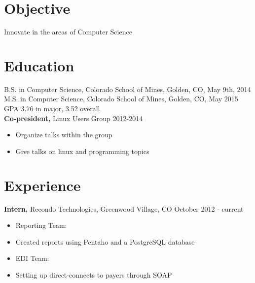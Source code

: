 \documentclass[12pt]{res}
\begin{document}

\address{{\bf Present Address} \\ 266 Pinto St \\ Golden, CO 80401 }
\address{{\bf Contact Information} \\ (720) 219-7914 \\ gik0geck0@gmail.com \\ https://github.com/gik0geck0 }

\begin{resume}

\section{Objective}
Innovate in the areas of Computer Science

\section{Education}
B.S. in Computer Science, Colorado School of Mines, Golden, CO, May 9th, 2014 \\
M.S. in Computer Science, Colorado School of Mines, Golden, CO, May 2015 \\
GPA 3.76 in major, 3.52 overall \\
{\bf Co-president,} Linux Users Group \hfill 2012-2014
    \begin{itemize} \itemsep -2pt
        \item Organize talks within the group
        \item Give talks on linux and programming topics
    \end{itemize}


\section{Experience}
 {\bf Intern,} Recondo Technologies, Greenwood Village, CO \hfill October 2012 - current
 \begin{itemize} \itemsep -2pt
     \item Reporting Team:
     \item Created reports using Pentaho and a PostgreSQL database
     \item EDI Team:
     \item Setting up direct-connects to payers through SOAP
 \end{itemize}


\end{resume}
\end{document}
